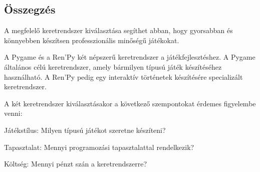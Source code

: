 \subsection{Összegzés}
\indent \indent A megfelelő keretrendszer kiválasztása segíthet abban, hogy gyorsabban és könnyebben készítsen professzionális minőségű játékokat.

A Pygame és a Ren'Py két népszerű keretrendszer a játékfejlesztéshez. A Pygame általános célú keretrendszer, amely bármilyen típusú játék készítéséhez használható. A Ren'Py pedig egy interaktív történetek készítésére specializált keretrendszer.

A két keretrendszer kiválasztásakor a következő szempontokat érdemes figyelembe venni:

Játékstílus: Milyen típusú játékot szeretne készíteni?

Tapasztalat: Mennyi programozási tapasztalattal rendelkezik?

Költség: Mennyi pénzt szán a keretrendszerre?



